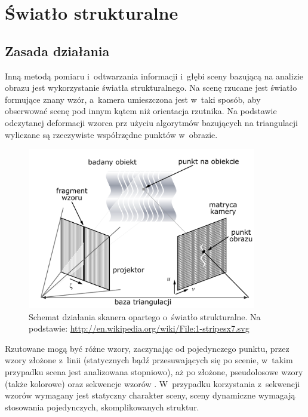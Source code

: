\section{Światło strukturalne}

\subsection{Zasada działania}

Inną metodą pomiaru i~odtwarzania informacji i~głębi sceny bazującą na analizie
obrazu jest wykorzystanie światła strukturalnego. Na scenę rzucane jest światło
formujące znany wzór, a~kamera umieszczona jest w~taki sposób, aby obserwować
scenę pod innym kątem niż orientacja rzutnika. Na podstawie odczytanej deformacji
wzorca prz użyciu algorytmów bazujących na triangulacji wyliczane są rzeczywiste
współrzędne punktów w~obrazie.

\begin{figure}[htb!]
\centering
\includegraphics[width=10cm]{../../Common/img/struct}
\caption[Schemat działania skanera opartego o~światło strukturalne]
{Schemat działania skanera opartego o~światło strukturalne. Na podstawie:
\url{http://en.wikipedia.org/wiki/File:1-stripesx7.svg}}
\label{fig:struct_principle}
\end{figure}

Rzutowane mogą być różne wzory, zaczynając od pojedynczego punktu, przez
wzory złożone z~linii (statycznych bądź przesuwających się po
scenie, w~takim przypadku scena jest analizowana stopniowo), aż po złożone,
pseudolosowe wzory (także kolorowe) oraz sekwencje wzorów \cite{1588327}. 
W~przypadku korzystania z~sekwencji wzorów wymagany jest statyczny charakter
sceny, sceny dynamiczne wymagają stosowania pojedynczych, skomplikowanych
struktur.

